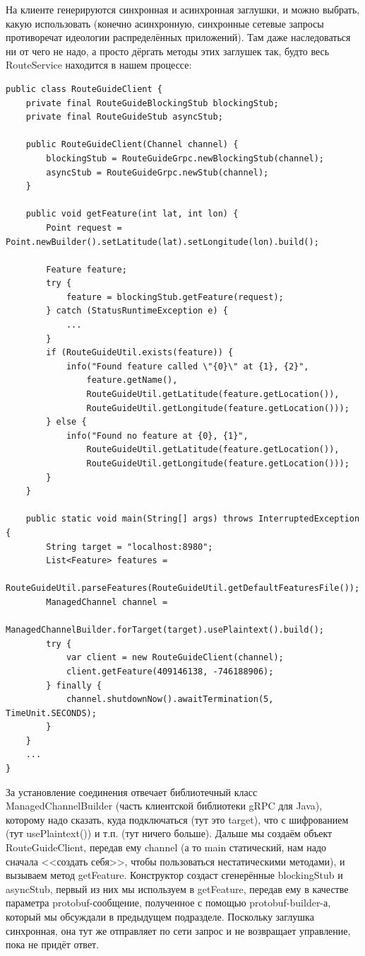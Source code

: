 \documentclass{../../text-style}
\begin{document}
На клиенте генерируются синхронная и асинхронная заглушки, и можно выбрать, какую использовать (конечно асинхронную, синхронные сетевые запросы противоречат идеологии распределённых приложений). Там даже наследоваться ни от чего не надо, а просто дёргать методы этих заглушек так, будто весь RouteService находится в нашем процессе:

\begin{verbatim}
public class RouteGuideClient {
    private final RouteGuideBlockingStub blockingStub;
    private final RouteGuideStub asyncStub;

    public RouteGuideClient(Channel channel) {
        blockingStub = RouteGuideGrpc.newBlockingStub(channel);
        asyncStub = RouteGuideGrpc.newStub(channel);
    }

    public void getFeature(int lat, int lon) {
        Point request = Point.newBuilder().setLatitude(lat).setLongitude(lon).build();
        
        Feature feature;
        try {
            feature = blockingStub.getFeature(request);
        } catch (StatusRuntimeException e) {
            ...
        }
        if (RouteGuideUtil.exists(feature)) {
            info("Found feature called \"{0}\" at {1}, {2}",
                feature.getName(),
                RouteGuideUtil.getLatitude(feature.getLocation()),
                RouteGuideUtil.getLongitude(feature.getLocation()));
        } else {
            info("Found no feature at {0}, {1}",
                RouteGuideUtil.getLatitude(feature.getLocation()),
                RouteGuideUtil.getLongitude(feature.getLocation()));
        }
    }

    public static void main(String[] args) throws InterruptedException {
        String target = "localhost:8980";
        List<Feature> features = 
            RouteGuideUtil.parseFeatures(RouteGuideUtil.getDefaultFeaturesFile());
        ManagedChannel channel = 
            ManagedChannelBuilder.forTarget(target).usePlaintext().build();
        try {
            var client = new RouteGuideClient(channel);
            client.getFeature(409146138, -746188906);
        } finally {
            channel.shutdownNow().awaitTermination(5, TimeUnit.SECONDS);
        }
    }
    ...
}
\end{verbatim}

За установление соединения отвечает библиотечный класс ManagedChannelBuilder (часть клиентской библиотеки gRPC для Java), которому надо сказать, куда подключаться (тут это target), что с шифрованием (тут usePlaintext()) и т.п. (тут ничего больше). Дальше мы создаём объект RouteGuideClient, передав ему channel (а то main статический, нам надо сначала <<создать себя>>, чтобы пользоваться нестатическими методами), и вызываем метод getFeature. Конструктор создаст сгенерённые blockingStub и asyncStub, первый из них мы используем в getFeature, передав ему в качестве параметра protobuf-сообщение, полученное с помощью protobuf-builder-а, который мы обсуждали в предыдущем подразделе. Поскольку заглушка синхронная, она тут же отправляет по сети запрос и не возвращает управление, пока не придёт ответ.
\end{document}
